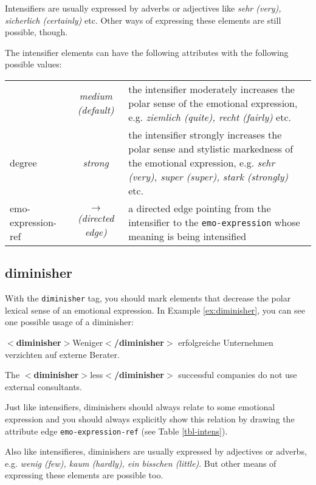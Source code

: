 \documentclass[11pt,a4paper]{article}
\newcommand{\xmltag}[1]{{\textbf{\small$<$#1$>$}}}
\newcommand{\diminisher}[1]{\xmltag{diminisher}#1\xmltag{/diminisher}}
\newlength\clmnwidth
\newenvironment{myexe}{
  \begin{exe}
    \ex\begin{center}
    \itshape
}{
    \end{center}
  \end{exe}
}
\begin{document}
Intensifiers are usually expressed by adverbs or adjectives like
\textit{sehr (very), sicherlich (certainly)} etc.  Other ways of
expressing these elements are still possible, though.

The intensifier elements can have the following attributes with the
following possible values:
\begin{center}
  \begin{tabular}{|l|c|p{\clmnwidth}|}\hline\label{tbl-intens}

    & \textit{medium (default)} & the intensifier moderately increases
    the polar sense of the emotional expression, e.g. \textit{ziemlich
      (quite), recht (fairly)} etc.\\\cline{2-3}

    \multirow{-2}{*}{degree} & \textit{strong} & the intensifier
    strongly increases the polar sense and stylistic markedness of the
    emotional expression, e.g. \textit{sehr (very), super (super),
      stark (strongly)} etc.\\\hline


    emo-expression-ref & \textit{$\longrightarrow$\newline(directed
      edge)} & a directed edge pointing from the intensifier to the
    \texttt{emo-expression} whose meaning is being intensified\\\hline
  \end{tabular}
\end{center}

\subsection{diminisher}
With the \texttt{diminisher} tag, you should mark elements that
decrease the polar lexical sense of an emotional expression.  In
Example \ref{ex:diminisher}, you can see one possible usage of a
diminisher:
\begin{myexe}
  \diminisher{Weniger} erfolgreiche Unternehmen verzichten auf externe
  Berater.\label{ex:diminisher}

  The \diminisher{less} successful companies do not use external
  consultants.
\end{myexe}
Just like intensifiers, diminishers should always relate to some emotional
expression and you should always explicitly show this relation by drawing the
attribute edge \texttt{emo-expression-ref} (see Table \ref{tbl-intens}).

Also like intensifieres, diminishers are usually expressed by
adjectives or adverbs, e.g. \textit{wenig (few), kaum (hardly), ein
  bisschen (little)}.  But other means of expressing these elements
are possible too.
\end{document}
